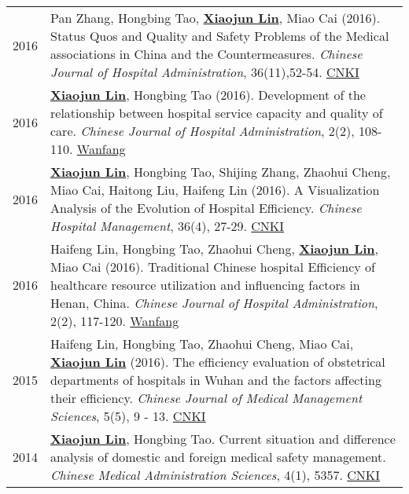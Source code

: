\documentclass[a4paper,10pt]{article}
\begin{document}
\begin{longtable}{r p{13cm}}
2016 & Pan Zhang, Hongbing Tao,  \underline{\textbf{Xiaojun Lin}}, Miao Cai (2016). Status Quos and Quality and Safety Problems of the Medical associations in China and the Countermeasures. \emph{ Chinese Journal of Hospital Administration}, 36(11),52-54. \href{http://kns.cnki.net/KCMS/detail/detail.aspx?dbcode=CJFQ&dbname=CJFDLAST2016&filename=YYGL201611027&v=MjM5Mjl1WnNGaXZtVTcvS1BEVE1Zckc0SDlmTnJvOUhZNFI4ZVgxTHV4WVM3RGgxVDNxVHJXTTFGckNVUkxLZVo=}{CNKI}\\
2016 & \underline{\textbf{Xiaojun Lin}}, Hongbing Tao (2016). Development of the relationship between hospital service capacity and quality of care. \emph{ Chinese Journal of Hospital Administration}, 2(2), 108-110. \href{http://www.wanfangdata.com.cn/details/detail.do?_type=perio&id=zhyygl201602010}{Wanfang}\\
2016 & \underline{\textbf{Xiaojun Lin}}, Hongbing Tao, Shijing Zhang, Zhaohui Cheng, Miao Cai, Haitong Liu, Haifeng Lin (2016). A Visualization Analysis of the Evolution of Hospital Efficiency. \emph{ Chinese Hospital Management}, 36(4), 27-29. \href{http://kns.cnki.net/KCMS/detail/detail.aspx?dbcode=CJFQ&dbname=CJFDLAST2016&filename=YYGL201604015&v=MjM5ODRSTEtlWnVadEZpRG5VNy9MUERUTVlyRzRIOWZNcTQ5RVlZUjhlWDFMdXhZUzdEaDFUM3FUcldNMUZyQ1U=}{CNKI}\\
2016 & Haifeng Lin, Hongbing Tao, Zhaohui Cheng, \underline{\textbf{Xiaojun Lin}}, Miao Cai (2016). Traditional Chinese hospital Efficiency of healthcare resource utilization and influencing factors in Henan, China. \emph{ Chinese Journal of Hospital Administration}, 2(2), 117-120. \href{http://www.wanfangdata.com.cn/details/detail.do?_type=perio&id=zhyygl201602013}{Wanfang}\\
2015 & Haifeng Lin, Hongbing Tao, Zhaohui Cheng, Miao Cai, \underline{\textbf{Xiaojun Lin}} (2016). The efficiency evaluation of obstetrical departments of hospitals in Wuhan and the factors affecting their efficiency. \emph{Chinese Journal of Medical Management Sciences}, 5(5), 9 - 13. \href{http://kns.cnki.net/KCMS/detail/detail.aspx?dbcode=CJFQ&dbname=CJFDLAST2015&filename=YLGL201505004&v=MjkxODIxTHV4WVM3RGgxVDNxVHJXTTFGckNVUkxLZVp1WnNGaXZtVkx2QVBDSE1Zckc0SDlUTXFvOUZZSVI4ZVg=}{CNKI}\\
2014 & \underline{\textbf{Xiaojun Lin}}, Hongbing Tao. Current situation and difference analysis of domestic and foreign medical safety management. \emph{ Chinese Medical Administration Sciences}, 4(1), 5357. \href{http://kns.cnki.net/KCMS/detail/detail.aspx?dbcode=CJFQ&dbname=CJFD2014&filename=YLGL201401019&v=MjQzMzVUcldNMUZyQ1VSTEtlWnVadEZpRG5WNy9JUENITVlyRzRIOVhNcm85RWJZUjhlWDFMdXhZUzdEaDFUM3E=}{CNKI}\\

\end{longtable}
\end{document}
